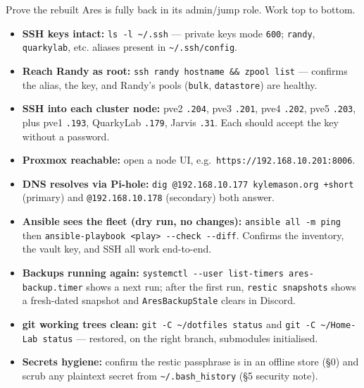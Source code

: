 \documentclass[
]{article}
\providecommand{\tightlist}{%
  \setlength{\itemsep}{0pt}\setlength{\parskip}{0pt}}
\begin{document}
Prove the rebuilt Ares is fully back in its admin/jump role. Work top to
bottom.

\begin{itemize}
\tightlist
\item[$\square$]
  \textbf{SSH keys intact:} \texttt{ls\ -l\ \textasciitilde{}/.ssh} ---
  private keys mode \texttt{600}; \texttt{randy}, \texttt{quarkylab},
  etc. aliases present in \texttt{\textasciitilde{}/.ssh/config}.
\item[$\square$]
  \textbf{Reach Randy as root:}
  \texttt{ssh\ randy\ \textquotesingle{}hostname\ \&\&\ zpool\ list\textquotesingle{}}
  --- confirms the alias, the key, and Randy's pools (\texttt{bulk},
  \texttt{datastore}) are healthy.
\item[$\square$]
  \textbf{SSH into each cluster node:} pve2 \texttt{.204}, pve3
  \texttt{.201}, pve4 \texttt{.202}, pve5 \texttt{.203}, plus pve1
  \texttt{.193}, QuarkyLab \texttt{.179}, Jarvis \texttt{.31}. Each
  should accept the key without a password.
\item[$\square$]
  \textbf{Proxmox reachable:} open a node UI,
  e.g.~\texttt{https://192.168.10.201:8006}.
\item[$\square$]
  \textbf{DNS resolves via Pi-hole:}
  \texttt{dig\ @192.168.10.177\ kylemason.org\ +short} (primary) and
  \texttt{@192.168.10.178} (secondary) both answer.
\item[$\square$]
  \textbf{Ansible sees the fleet (dry run, no changes):}
  \texttt{ansible\ all\ -m\ ping} then
  \texttt{ansible-playbook\ \textless{}play\textgreater{}\ -\/-check\ -\/-diff}.
  Confirms the inventory, the vault key, and SSH all work end-to-end.
\item[$\square$]
  \textbf{Backups running again:}
  \texttt{systemctl\ -\/-user\ list-timers\ ares-backup.timer} shows a
  next run; after the first run, \texttt{restic\ snapshots} shows a
  fresh-dated snapshot and \texttt{AresBackupStale} clears in Discord.
\item[$\square$]
  \textbf{git working trees clean:}
  \texttt{git\ -C\ \textasciitilde{}/dotfiles\ status} and
  \texttt{git\ -C\ \textasciitilde{}/Home-Lab\ status} --- restored, on
  the right branch, submodules initialised.
\item[$\square$]
  \textbf{Secrets hygiene:} confirm the restic passphrase is in an
  offline store (§0) and scrub any plaintext secret from
  \texttt{\textasciitilde{}/.bash\_history} (§5 security note).
\end{itemize}
\end{document}
